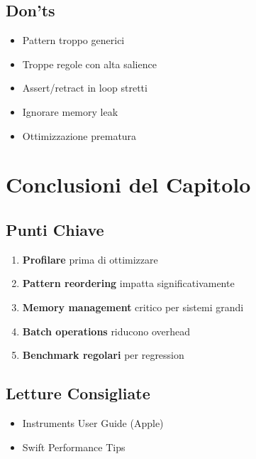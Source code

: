 \subsection{Don'ts}

\begin{warningbox}[Da Evitare]
\begin{itemize}
\item Pattern troppo generici
\item Troppe regole con alta salience
\item Assert/retract in loop stretti
\item Ignorare memory leak
\item Ottimizzazione prematura
\end{itemize}
\end{warningbox}

\section{Conclusioni del Capitolo}

\subsection{Punti Chiave}

\begin{enumerate}
\item \textbf{Profilare} prima di ottimizzare
\item \textbf{Pattern reordering} impatta significativamente
\item \textbf{Memory management} critico per sistemi grandi
\item \textbf{Batch operations} riducono overhead
\item \textbf{Benchmark regolari} per regression
\end{enumerate}

\subsection{Letture Consigliate}

\begin{itemize}
\item Instruments User Guide (Apple)
\item Swift Performance Tips
\end{itemize}

